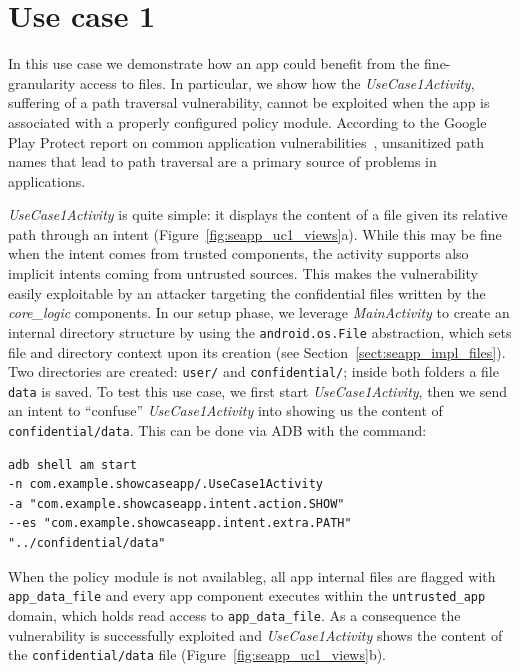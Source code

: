 \vspace{-1.6em}\section{Use case 1}\label{appendix:seapp_uc1}

\vspace*{-0.5em}
In this use case we demonstrate how an app could benefit from the
fine-granularity access to files.  In particular, we show how the {\em
  UseCase1Activity}, suffering of a path traversal vulnerability,
cannot be exploited when the app is associated with a properly
configured policy module.  According to the Google Play Protect report
on common application
vulnerabilities~\cite{seapp_common_play_protect_vulnerabilites},
unsanitized path names that lead to path traversal are a primary
source of problems in applications.

{\em UseCase1Activity} is quite simple: it displays the content of a
file given its relative path through an intent
(Figure~\ref{fig:seapp_uc1_views}a). While this may be fine when the
intent comes from trusted components, the activity supports also
implicit intents coming from untrusted sources. This makes the
vulnerability easily exploitable by an attacker targeting the
confidential files written by the {\em core\_logic} components.
%
In our setup phase, we leverage {\em MainActivity} to create an
internal directory structure by using the {\tt android.os.File}
abstraction, which sets file and directory context upon its creation
(see Section~\ref{sect:seapp_impl_files}). Two directories are
created: {\tt user/} and {\tt confidential/}; inside both folders a
file {\tt data} is saved.
%
To test this use case, we first start {\em UseCase1Activity}, then we
send an intent to ``confuse'' {\em UseCase1Activity} into showing us
the content of {\tt confidential/data}. This can be done via ADB with
the command:
\begin{lstlisting}[numbers=none]
adb shell am start
-n com.example.showcaseapp/.UseCase1Activity
-a "com.example.showcaseapp.intent.action.SHOW"
--es "com.example.showcaseapp.intent.extra.PATH" "../confidential/data"
\end{lstlisting}
\normalsize

When the policy module is not availableg, all app internal files are
flagged with {\tt app\_data\_file} and every app component executes
within the {\tt untrusted\_app} domain, which holds read access to
{\tt app\_data\_file}. As a consequence the vulnerability is
successfully exploited and {\em UseCase1Activity} shows the content of
the {\tt confidential/data} file (Figure~\ref{fig:seapp_uc1_views}b).

